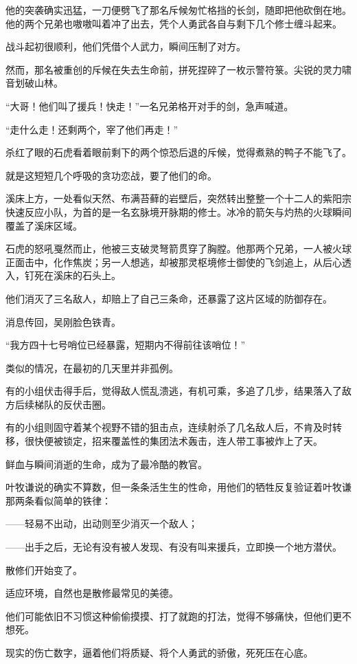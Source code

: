 他的突袭确实迅猛，一刀便劈飞了那名斥候匆忙格挡的长剑，随即把他砍倒在地。他的两个兄弟也嗷嗷叫着冲了出去，凭个人勇武各自与剩下几个修士缠斗起来。

战斗起初很顺利，他们凭借个人武力，瞬间压制了对方。

然而，那名被重创的斥候在失去生命前，拼死捏碎了一枚示警符箓。尖锐的灵力啸音划破山林。

“大哥！他们叫了援兵！快走！”一名兄弟格开对手的剑，急声喊道。

“走什么走！还剩两个，宰了他们再走！”

杀红了眼的石虎看着眼前剩下的两个惊恐后退的斥候，觉得煮熟的鸭子不能飞了。

就是这短短几个呼吸的贪功恋战，要了他们的命。

溪床上方，一处看似天然、布满苔藓的岩壁后，突然转出整整一个十二人的紫阳宗快速反应小队，为首的是一名玄脉境开脉期的修士。冰冷的箭矢与灼热的火球瞬间覆盖了溪床区域。

石虎的怒吼戛然而止，他被三支破灵弩箭贯穿了胸膛。他那两个兄弟，一人被火球正面击中，化作焦炭；另一人想逃，却被那灵枢境修士御使的飞剑追上，从后心透入，钉死在溪床的石头上。

他们消灭了三名敌人，却赔上了自己三条命，还暴露了这片区域的防御存在。

消息传回，吴刚脸色铁青。

“我方四十七号哨位已经暴露，短期内不得前往该哨位！”

类似的情况，在最初的几天里并非孤例。

有的小组伏击得手后，觉得敌人慌乱溃逃，有机可乘，多追了几步，结果落入了敌方后续梯队的反伏击圈。

有的小组则固守着某个视野不错的狙击点，连续射杀了几名敌人后，不肯及时转移，很快便被锁定，招来覆盖性的集团法术轰击，连人带工事被炸上了天。

鲜血与瞬间消逝的生命，成为了最冷酷的教官。

叶牧谦说的确实不算数，但一条条活生生的性命，用他们的牺牲反复验证着叶牧谦那两条看似简单的铁律：

——轻易不出动，出动则至少消灭一个敌人；

——出手之后，无论有没有被人发现、有没有叫来援兵，立即换一个地方潜伏。

散修们开始变了。

适应环境，自然也是散修最常见的美德。

他们可能依旧不习惯这种偷偷摸摸、打了就跑的打法，觉得不够痛快，但他们更不想死。

现实的伤亡数字，逼着他们将质疑、将个人勇武的骄傲，死死压在心底。

